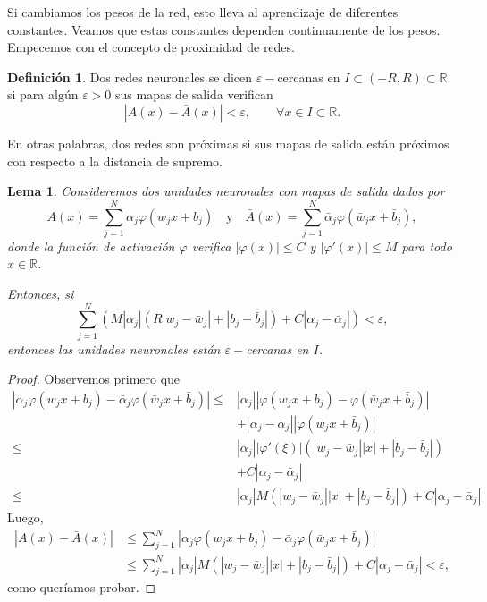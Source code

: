 \documentclass[12pt, a4paper]{amsbook}
\newcommand{\ve}{\varepsilon}
\newcommand{\R}{{\mathbb R}}
\newtheorem{lema}[teo]{Lema}
\theoremstyle{remark}
\theoremstyle{definition}
\newtheorem{defi}[teo]{Definici\'on}
\numberwithin{section}{chapter}
\numberwithin{subsection}{section}
\numberwithin{equation}{section}
\numberwithin{figure}{chapter}
\begin{document}
Si cambiamos los pesos de la red, esto lleva al aprendizaje de diferentes constantes. Veamos que estas constantes dependen continuamente de los pesos. Empecemos con el concepto de proximidad de redes.
\begin{defi}
Dos redes neuronales se dicen $\ve-$cercanas en $I\subset (-R, R)\subset \R$ si para algún $\ve>0$ sus mapas de salida verifican
$$
|A(x) - \bar A(x)|<\ve, \qquad \forall x\in I\subset \R.
$$
\end{defi}

En otras palabras, dos redes son próximas si sus mapas de salida están próximos con respecto a la distancia de supremo.

\begin{lema}\label{7.8.4}
Consideremos dos unidades neuronales con mapas de salida dados por 
$$
A(x) = \sum_{j=1}^N \alpha_j \varphi(w_j x+ b_j) \quad \text{y}\quad \bar A(x) = \sum_{j=1}^N \bar\alpha_j \varphi(\bar w_j x+ \bar b_j),
$$
donde la función de activación $\varphi$ verifica $|\varphi(x)|\le C$ y $|\varphi'(x)|\le M$ para todo $x\in \R$.

Entonces, si
$$
\sum_{j=1}^N \left(M|\alpha_j|(R |w_j-\bar w_j| + |b_j-\bar b_j|) + C|\alpha_j-\bar\alpha_j|\right) <\ve,
$$
entonces las unidades neuronales están $\ve-$cercanas en $I$.
\end{lema}

\begin{proof}
Observemos primero que
\begin{align*}
|\alpha_j \varphi(w_j x + b_j) - \bar\alpha_j \varphi(\bar w_j x + \bar b_j)| \le& |\alpha_j| |\varphi(w_j x + b_j) - \varphi(\bar w_j x + \bar b_j)|\\
& +|\alpha_j -\bar \alpha_j| |\varphi(\bar w_j x + \bar b_j)| \\
\le &|\alpha_j| |\varphi'(\xi)| (|w_j-\bar w_j| |x| + |b_j-\bar b_j|)\\
&+ C|\alpha_j - \bar\alpha_j|\\
\le & |\alpha_j| M(|w_j-\bar w_j| |x| + |b_j-\bar b_j|) +  C|\alpha_j - \bar\alpha_j|
\end{align*}
Luego, 
\begin{align*}
|A(x)-\bar A(x)|&\le \sum_{j=1}^N|\alpha_j \varphi(w_j x + b_j) - \bar\alpha_j \varphi(\bar w_j x + \bar b_j)|\\
&\le \sum_{j=1}^N|\alpha_j| M(|w_j-\bar w_j| |x| + |b_j-\bar b_j|) +  C|\alpha_j - \bar\alpha_j|<\ve,
\end{align*}
como queríamos probar.
\end{proof}
\end{document}
